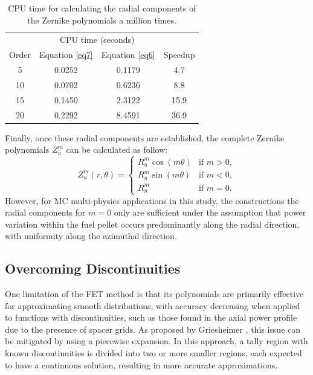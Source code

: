 \begin{table}
    \centering
    \caption[CPU time for calculating the radial components of the Zernike polynomials]{CPU time for calculating the radial components of the Zernike polynomials a million times.}
    \label{tab_z} 
    \begin{tabular}{| c | c | c | c | }
    \hline
           & \multicolumn{2}{c|}{CPU time (seconds)} &        \\
    \cline{2-3}
     Order & Equation \ref{eq7} & Equation \ref{eq6} & Speedup \\
     \hline
     5    & 0.0252  & 0.1179 & 4.7      \\ \hline
     10   & 0.0702  & 0.6236 & 8.8      \\ \hline
     15   & 0.1450  & 2.3122 & 15.9     \\ \hline
     20   & 0.2292  & 8.4591 & 36.9     \\ \hline
    \end{tabular}
\end{table}

Finally, once these radial components are established, the complete Zernike polynomials $Z_n^m$ can be calculated as follow:
\begin{equation}
Z_n^m(r,\theta) = 
\begin{cases} 
    R_n^m \cos (m\theta) & \text{if } m > 0, \\
    R_n^m \sin (m\theta) & \text{if } m < 0, \\
    R_n^m                & \text{if } m = 0.
\end{cases}
\end{equation}
However, for MC multi-physics applications in this study, the constructions the radial components for $m=0$ only are sufficient under the assumption that power variation within the fuel pellet occurs predominantly along the radial direction, with uniformity along the azimuthal direction.

\subsection{Overcoming Discontinuities} \label{sec22x}
One limitation of the FET method is that its polynomials are primarily effective for approximating smooth distributions, with accuracy decreasing when applied to functions with discontinuities, such as those found in the axial power profile due to the presence of spacer grids. As proposed by Griesheimer \cite{gries}, this issue can be mitigated by using a piecewise expansion. In this approach, a tally region with known discontinuities is divided into two or more smaller regions, each expected to have a continuous solution, resulting in more accurate approximations.

